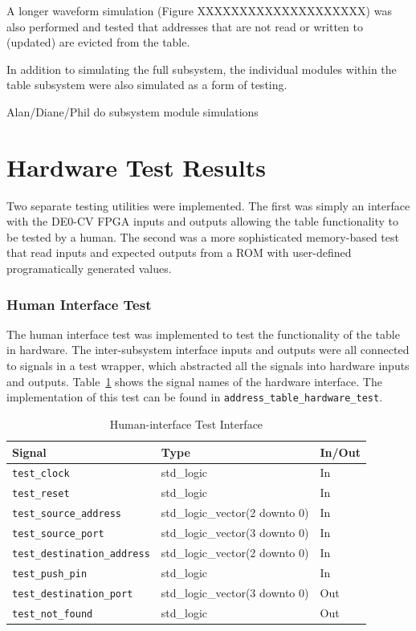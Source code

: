 \documentclass{article}
\begin{document}
A longer waveform simulation (Figure XXXXXXXXXXXXXXXXXXXX) was also performed and tested that addresses that are not read or written to (updated) are evicted from the table.

In addition to simulating the full subsystem, the individual modules within the table subsystem were also simulated as a form of testing. 

Alan/Diane/Phil do subsystem module simulations


\section{Hardware Test Results}

Two separate testing utilities were implemented. The first was simply an interface with the DE0-CV FPGA inputs and outputs allowing the table functionality to be tested by a human. The second was a more sophisticated memory-based test that read inputs and expected outputs from a ROM with user-defined programatically generated values.

\subsubsection{Human Interface Test}

The human interface test was implemented to test the functionality of the table in hardware. The inter-subsystem interface inputs and outputs were all connected to signals in a test wrapper, which abstracted all the signals into hardware inputs and outputs. Table~\ref{tab:test1} shows the signal names of the hardware interface. The implementation of this test can be found in \texttt{address\_table\_hardware\_test}.  

\begin{table}[ht]
    \begin{center}
        \begin{tabular}{lll}\hline
        Signal & Type & In/Out \\
        \hline
        \texttt{test\_clock} & std\_logic & In \\
        \hline
        \texttt{test\_reset} & std\_logic & In \\
        \hline
        \texttt{test\_source\_address} & std\_logic\_vector(2 downto 0) & In \\
        \hline
        \texttt{test\_source\_port} & std\_logic\_vector(3 downto 0) & In \\
        \hline
        \texttt{test\_destination\_address} & std\_logic\_vector(2 downto 0) & In \\
        \hline
        \texttt{test\_push\_pin} & std\_logic & In \\
        \hline
        \texttt{test\_destination\_port} & std\_logic\_vector(3 downto 0) & Out \\
        \hline
        \texttt{test\_not\_found} & std\_logic & Out \\
        \hline
        \end{tabular}
        \caption{Human-interface Test Interface}\label{tab:test1}
    \end{center}
\end{table}
\end{document}
